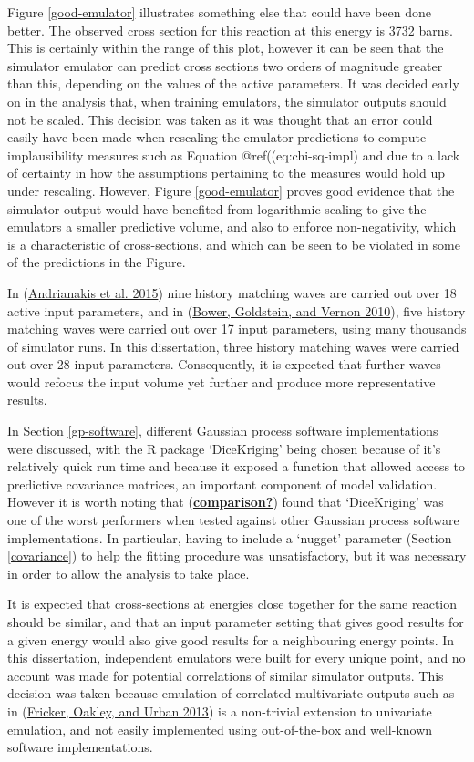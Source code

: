 \documentclass[
  12pt,
  a4paper,
  twoside]{book}
\begin{document}
Figure \ref{good-emulator} illustrates something else that could have been done better. The observed cross section for this reaction at this energy is 3732 barns. This is certainly within the range of this plot, however it can be seen that the simulator emulator can predict cross sections two orders of magnitude greater than this, depending on the values of the active parameters. It was decided early on in the analysis that, when training emulators, the simulator outputs should not be scaled. This decision was taken as it was thought that an error could easily have been made when rescaling the emulator predictions to compute implausibility measures such as Equation @ref((eq:chi-sq-impl) and due to a lack of certainty in how the assumptions pertaining to the measures would hold up under rescaling. However, Figure \ref{good-emulator} proves good evidence that the simulator output would have benefited from logarithmic scaling to give the emulators a smaller predictive volume, and also to enforce non-negativity, which is a characteristic of cross-sections, and which can be seen to be violated in some of the predictions in the Figure.

In (\protect\hyperlink{ref-jeremy_histmatch}{Andrianakis et al. 2015}) nine history matching waves are carried out over 18 active input parameters, and in (\protect\hyperlink{ref-bower2010galaxy}{Bower, Goldstein, and Vernon 2010}), five history matching waves were carried out over 17 input parameters, using many thousands of simulator runs. In this dissertation, three history matching waves were carried out over 28 input parameters. Consequently, it is expected that further waves would refocus the input volume yet further and produce more representative results.

In Section \ref{gp-software}, different Gaussian process software implementations were discussed, with the R package `DiceKriging' being chosen because of it's relatively quick run time and because it exposed a function that allowed access to predictive covariance matrices, an important component of model validation. However it is worth noting that (\protect\hyperlink{ref-comparison}{\textbf{comparison?}}) found that `DiceKriging' was one of the worst performers when tested against other Gaussian process software implementations. In particular, having to include a `nugget' parameter (Section \ref{covariance}) to help the fitting procedure was unsatisfactory, but it was necessary in order to allow the analysis to take place.

It is expected that cross-sections at energies close together for the same reaction should be similar, and that an input parameter setting that gives good results for a given energy would also give good results for a neighbouring energy points. In this dissertation, independent emulators were built for every unique point, and no account was made for potential correlations of similar simulator outputs. This decision was taken because emulation of correlated multivariate outputs such as in (\protect\hyperlink{ref-multivariate_gp}{Fricker, Oakley, and Urban 2013}) is a non-trivial extension to univariate emulation, and not easily implemented using out-of-the-box and well-known software implementations.
\end{document}
